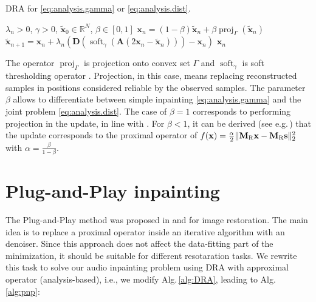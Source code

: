 \documentclass[conference]{IEEEtran}
\newcommand{\todo}[1]{\textcolor{red}{#1}}
\begin{document}
\begin{algorithm}
	\caption{DRA for \eqref{eq:analysis.gamma} or \eqref{eq:analysis.dist}.}
	\begin{algorithmic}[1]\label{alg:DRA}
		\renewcommand{\algorithmicrequire}{\textbf{Input:}}
		\renewcommand{\algorithmicensure}{\textbf{Output:}}
		\REQUIRE $ \lambda_n > 0 $, $ \gamma>0 $, $ \mathbf{\widetilde{x}}_0 \in \mathbb{R}^{N} $, $\beta \in [0, 1]$
		\STATE $\mathbf{x}_n= (1-\beta)\mathbf{\widetilde{x}}_n + \beta \operatorname{proj}_{\Gamma}(\mathbf{\widetilde{x}}_n) $ 
		\STATE $ \mathbf{\widetilde{x}}_{n+1} = \mathbf{x}_n + \lambda_n \left( \mathbf{D}\left(\operatorname{soft}_{\gamma}\left(\mathbf{A}\left(2\mathbf{x}_n-\mathbf{\widetilde{x}}_n\right) \right)\right) -\mathbf{x}_n\right)$
		\ENDFOR
		\RETURN $\mathbf{x}_n$ %
	\end{algorithmic} 
\end{algorithm}

The operator $ \operatorname{proj}_{\Gamma}$ is projection onto convex set $ \Gamma $ and $\operatorname{soft}_{\gamma}$ is soft thresholding operator \cite{Combettes2011}.
Projection, in this case, means replacing reconstructed samples in positions considered reliable by the observed samples.
The parameter $\beta$ allows to differentiate between simple inpainting \eqref{eq:analysis.gamma} and the joint problem \eqref{eq:analysis.dist}.
The case of $\beta = 1$ corresponds to performing projection in the update, in line with \cite{Mokry2020}.
For $\beta < 1$, it can be derived (see e.g.\,\cite[Sec.\,4 and Tab.\,1]{Combettes2011}) that the update corresponds to the proximal operator of $f(\mathbf{x}) = \frac{\alpha}{2} \Vert \mathbf{M}_{\textup{R}} \mathbf {x} - \mathbf{M}_{\textup{R}} \mathbf{s} \Vert^2_2$ with $\alpha = \frac{\beta}{1-\beta}$.


\section{Plug-and-Play inpainting} \label{sec:plugaandplay}

The Plug-and-Play method was proposed in \cite{Venkatakrishnan2013} and \cite{Chan2016} for image restoration.
The main idea is to replace a proximal operator inside an iterative algorithm with an denoiser.
Since this approach does not affect the data-fitting part of the minimization, it should be suitable for different resotaration tasks.
We rewrite this task to solve our audio inpainting problem using DRA with approximal operator (analysis-based), i.e., we modify Alg.\,\ref{alg:DRA}, leading to Alg.\,\ref{alg:pnp}:
\end{document}

